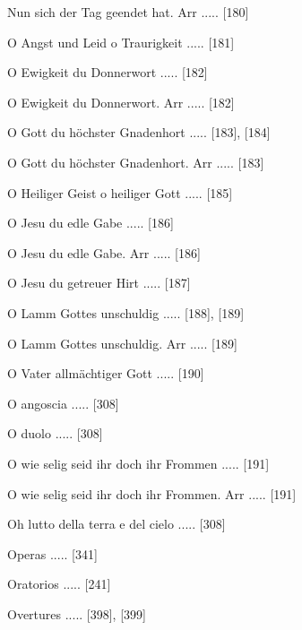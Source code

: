 \documentclass[twocolumn]{book}
\begin{document}
\newline 
Nun sich der Tag geendet hat. Arr ..... [180]

\newline 
O Angst und Leid o Traurigkeit ..... [181]

\newline 
O Ewigkeit du Donnerwort ..... [182]

\newline 
O Ewigkeit du Donnerwort. Arr ..... [182]

\newline 
O Gott du höchster Gnadenhort ..... [183], [184]

\newline 
O Gott du höchster Gnadenhort. Arr ..... [183]

\newline 
O Heiliger Geist o heiliger Gott ..... [185]

\newline 
O Jesu du edle Gabe ..... [186]

\newline 
O Jesu du edle Gabe. Arr ..... [186]

\newline 
O Jesu du getreuer Hirt ..... [187]

\newline 
O Lamm Gottes unschuldig ..... [188], [189]

\newline 
O Lamm Gottes unschuldig. Arr ..... [189]

\newline 
O Vater allmächtiger Gott ..... [190]

\newline 
O angoscia ..... [308]

\newline 
O duolo ..... [308]

\newline 
O wie selig seid ihr doch ihr Frommen ..... [191]

\newline 
O wie selig seid ihr doch ihr Frommen. Arr ..... [191]

\newline 
Oh lutto della terra e del cielo ..... [308]

\newline 
Operas ..... [341]

\newline 
Oratorios ..... [241]

\newline 
Overtures ..... [398], [399]
\end{document}
